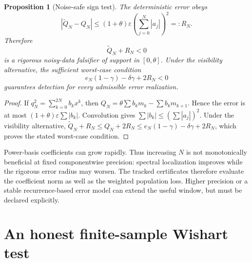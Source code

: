\documentclass[11pt]{article}
\newtheorem{proposition}[theorem]{Proposition}
\theoremstyle{definition}
\theoremstyle{remark}
\newcommand{\eps}{\varepsilon}
\begin{document}
\begin{proposition}[Noise-safe sign test]               \label{prop:noise}
The deterministic error obeys
\begin{equation}
 |\widetilde Q_N-Q_N|
 \leq(1+\theta)\eps\left(\sum_{j=0}^N|a_j|\right)^2
 =:R_N.                                                \label{eq:noiseradius}
\end{equation}
Therefore
\begin{equation}
 \widetilde Q_N+R_N<0                                 \label{eq:certsign}
\end{equation}
is a rigorous noisy-data falsifier of support in $[0,\theta]$.  Under the
visibility alternative, the sufficient worst-case condition
\begin{equation}
 e_N(1-\gamma)-\delta\gamma+2R_N<0                   \label{eq:robustdepth}
\end{equation}
guarantees detection for every admissible error realization.
\end{proposition}

\begin{proof}
If $q_N^2=\sum_{k=0}^{2N}b_kx^k$, then
$Q_N=\theta\sum b_km_k-\sum b_km_{k+1}$.  Hence the error is at most
$(1+\theta)\eps\sum|b_k|$.  Convolution gives
$\sum|b_k|\leq(\sum|a_j|)^2$.  Under the visibility alternative,
$\widetilde Q_N+R_N\leq Q_N+2R_N\leq
 e_N(1-\gamma)-\delta\gamma+2R_N$, which proves the stated worst-case
condition.
\end{proof}

Power-basis coefficients can grow rapidly.  Thus increasing $N$ is not
monotonically beneficial at fixed componentwise precision: spectral
localization improves while the rigorous error radius may worsen.  The tracked
certificates therefore evaluate the coefficient norm as well as the weighted
population loss.  Higher precision or a stable recurrence-based error model
can extend the useful window, but must be declared explicitly.

\section{An honest finite-sample Wishart test}
\label{sec:wishart}
\end{document}
